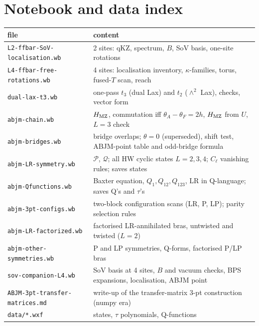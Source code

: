 \documentclass[11pt]{article}
\newcommand{\cP}{\mathcal P}
\newcommand{\cQ}{\mathcal Q}
\newcommand{\HMZ}{H_{\rm MZ}}
\newcommand{\nb}[1]{\texttt{#1}}
\begin{document}
\appendix
\section{Notebook and data index}
\begin{longtable}{p{}p{}}
\toprule
file & content\\
\midrule
\nb{L2-ffbar-SoV-localisation.wb} & 2 sites: qKZ, spectrum, $B$, SoV basis, one-site rotations\\
\nb{L4-ffbar-free-rotations.wb} & 4 sites: localisation inventory, $\kappa$-families, torus, fused-$T$ scan, reach\\
\nb{dual-lax-t3.wb} & one-pass $t_3$ (dual Lax) and $t_2$ ($\wedge^2$ Lax), checks, vector form\\
\nb{abjm-chain.wb} & $\HMZ$, commutation iff $\theta_A-\theta_F=2h$, $\HMZ$ from $U$, $L=3$ check\\
\nb{abjm-bridges.wb} & bridge overlaps; $\theta=0$ (superseded), shift test, ABJM-point table and odd-bridge formula\\
\nb{abjm-LR-symmetry.wb} & $\cP$, $\cQ$; all HW cyclic states $L=2,3,4$; $C_\ell$ vanishing rules; saves states\\
\nb{abjm-Qfunctions.wb} & Baxter equation, $Q_1,Q_{12},Q_{123}$, LR in Q-language; saves Q's and $\tau$'s\\
\nb{abjm-3pt-configs.wb} & two-block configuration scans (LR, P, LP); parity selection rules\\
\nb{abjm-LR-factorized.wb} & factorised LR-annihilated bras, untwisted and twisted ($L=2$)\\
\nb{abjm-other-symmetries.wb} & P and LP symmetries, Q-forms, factorised P/LP bras\\
\nb{sov-companion-L4.wb} & SoV basis at 4 sites, $B$ and vacuum checks, BPS expansions, localisation, ABJM point\\
\nb{ABJM-3pt-transfer-matrices.md} & write-up of the transfer-matrix 3-pt construction (numpy era)\\
\nb{data/*.wxf} & states, $\tau$ polynomials, Q-functions\\
\bottomrule
\end{longtable}
\end{document}
